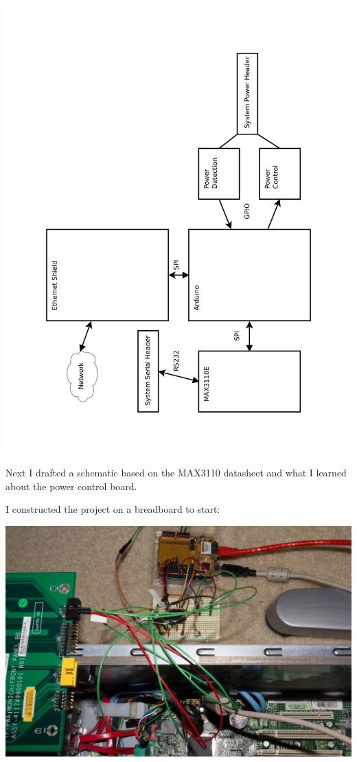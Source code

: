 \documentclass{amsart}
\begin{document}
\begin{center}
\includegraphics[height=\textwidth,angle=270]{hw-block.pdf}
\end{center}

Next I drafted a schematic based on the MAX3110 datasheet and what I learned about the power control board.



I constructed the project on a breadboard to start:

\begin{center}
\includegraphics[width=.9\textwidth]{lom-02.jpg}
\end{center}
\end{document}
